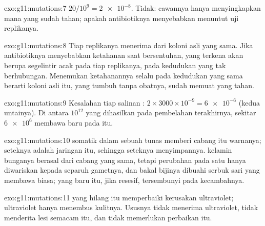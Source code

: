 \begin{solution}{exo:g11:mutations:7}
$20/10^9 = \num{2e-8}$. Tidak: cawannya hanya menyingkapkan  mana
yang sudah tahan; apakah antibiotiknya menyebabkan  menuntut
uji replikanya.
\end{solution}

\begin{solution}{exo:g11:mutations:8}
Tiap replikanya menerima  dari koloni asli yang sama. Jika
antibiotiknya menyebabkan ketahanan saat bersentuhan,  yang terkena
akan berupa segelintir  acak pada tiap replikanya, pada kedudukan
yang tak berhubungan. Menemukan ketahanannya selalu pada kedudukan yang
sama berarti koloni asli itu, yang tumbuh tanpa obatnya, sudah memuat
 yang tahan.
\end{solution}

\begin{solution}{exo:g11:mutations:9}
Kesalahan tiap salinan : $2 \times 3000 \times 10^{-9} =
\num{6e-6}$ (kedua untainya). Di antara $10^{12}$  yang dihasilkan
pada pembelahan terakhirnya, sekitar $\num{6e6}$ membawa  baru
pada  itu.
\end{solution}

\begin{solution}{exo:g11:mutations:10}
 somatik dalam sebuah  tunas memberi cabang itu warnanya;
seteknya adalah jaringan itu, sehingga seteknya menyimpannya. 
kelamin bunganya berasal dari cabang yang sama, tetapi perubahan pada
satu  hanya diwariskan kepada separuh gametnya, dan bakal bijinya
dibuahi serbuk sari yang membawa  biasa;  yang baru itu, jika
resesif, tersembunyi pada kecambahnya.
\end{solution}

\begin{solution}{exo:g11:mutations:11}
 yang hilang itu memperbaiki kerusakan ultraviolet; ultraviolet
hanya menembus kulitnya. Ususnya tidak menerima ultraviolet, tidak
menderita lesi semacam itu, dan tidak memerlukan perbaikan itu.
\end{solution}

